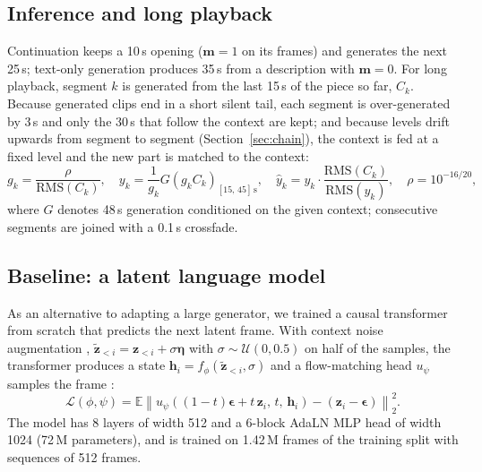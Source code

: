 \subsection{Inference and long playback}\label{sec:longplay}
Continuation keeps a 10\,s opening ($\mathbf{m}=1$ on its frames) and generates the next 25\,s; text-only generation
produces 35\,s from a description with $\mathbf{m}=0$. For long playback, segment $k$ is generated from the last
15\,s of the piece so far, $C_k$. Because generated clips end in a short silent tail, each segment is
over-generated by 3\,s and only the 30\,s that follow the context are kept; and because levels drift upwards from
segment to segment (Section~\ref{sec:chain}), the context is fed at a fixed level and the new part is matched to
the context:
\begin{equation}
  g_k = \frac{\rho}{\mathrm{RMS}(C_k)},\quad
  y_k = \frac{1}{g_k} G\!\left(g_k C_k\right)_{[15,\,45]\,\mathrm{s}},\quad
  \hat{y}_k = y_k \cdot \frac{\mathrm{RMS}(C_k)}{\mathrm{RMS}(y_k)},\quad \rho = 10^{-16/20},
\end{equation}
where $G$ denotes 48\,s generation conditioned on the given context; consecutive segments are joined with a 0.1\,s
crossfade.

\subsection{Baseline: a latent language model}
As an alternative to adapting a large generator, we trained a causal transformer from scratch that predicts the
next latent frame. With context noise augmentation \citep{pasini2024continuous},
$\tilde{\mathbf{z}}_{<i} = \mathbf{z}_{<i} + \sigma\boldsymbol{\eta}$ with $\sigma\sim\mathcal{U}(0,0.5)$ on half of
the samples, the transformer produces a state $\mathbf{h}_i = f_\phi(\tilde{\mathbf{z}}_{<i}, \sigma)$ and a
flow-matching head $u_\psi$ samples the frame \citep{li2024mar}:
\begin{equation}
  \mathcal{L}(\phi,\psi) = \mathbb{E}\left\| u_\psi\!\left((1-t)\boldsymbol{\epsilon} + t\,\mathbf{z}_i,\, t,\, \mathbf{h}_i\right) - (\mathbf{z}_i - \boldsymbol{\epsilon}) \right\|_2^2 .
\end{equation}
The model has 8 layers of width 512 and a 6-block AdaLN MLP head of width 1024 (72\,M parameters), and is trained
on 1.42\,M frames of the training split with sequences of 512 frames.

